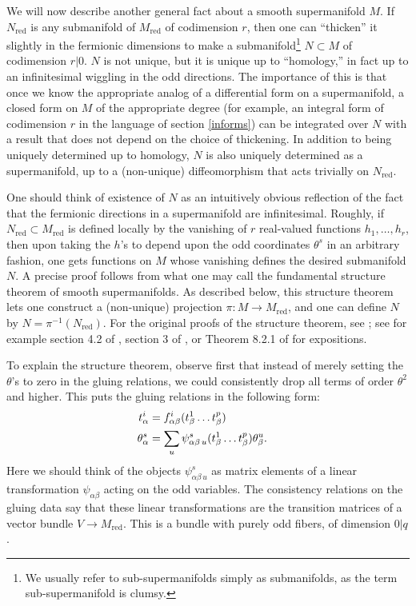 \documentclass[11pt,a4paper]{article}
\def\red{{\mathrm{red}}}
\begin{document}
We will now describe another general fact about a smooth supermanifold $M$.  If $N_\red$ is any submanifold of $M_\red$ of codimension $r$, then one can ``thicken'' it slightly in the fermionic
dimensions to make a submanifold\footnote{We usually refer to sub-supermanifolds simply as submanifolds, as the term sub-supermanifold is clumsy.}
$N\subset M$  of codimension $r|0$.  $N$ is not unique, but it is unique up to ``homology,'' in fact 
up to an 
infinitesimal wiggling in the odd directions.  The importance of this is that once we know the 
appropriate analog of a differential form on a supermanifold, a closed form on $M$ of the appropriate degree
(for example, an integral form of codimension $r$ in the language of section \ref{informs}) can be integrated over $N$ with a result that does not depend on the choice of thickening.  In addition to being uniquely determined up to homology, 
$N$ is also uniquely determined as a supermanifold, up to a (non-unique) diffeomorphism that acts trivially on $N_\red$.

One should think of existence of $N$ 
as an intuitively obvious reflection of the fact that the fermionic directions in a supermanifold
are infinitesimal.  Roughly, if $N_\red\subset M_\red$ is defined
locally by the vanishing of $r$ real-valued functions $h_1,\dots,h_r$, then upon taking the $h$'s to depend upon the odd coordinates $\theta^s$  in an arbitrary fashion, one
gets functions on $M$ whose vanishing defines the desired submanifold $N$.  A precise proof follows from what one may call the fundamental structure theorem of smooth supermanifolds.   As described 
below, this structure theorem lets one construct a (non-unique) projection $\pi:M\to M_\red$, and one can define  $N$ by $N=\pi^{-1}(N_\red)$. 
For  the original proofs of the structure theorem, see \cite{Ber, Bach, Gaw}; see for example section 4.2 of  \cite{Manin},  section 3 of   \cite{Voronov}, or Theorem 8.2.1 of \cite{Rogers} for expositions.

To explain the structure theorem, observe first that instead of merely setting the $\theta$'s to zero in the gluing relations, we could consistently drop
all terms of order $\theta^2$ and higher.  This puts the gluing relations in the following form:
\begin{align}\label{zoro}    t^i_\alpha & = f_{\alpha\beta}^i(t^1_\beta\dots t^p_\beta) \cr
                                                      \theta^s_\alpha& = \sum_u\psi_{\alpha\beta\,u}^s(t^1_\beta\dots t^p_\beta)\theta^u_\beta.\end{align}     
Here we should think of the objects $\psi_{\alpha\beta\,u}^s$ as matrix elements of a linear transformation $\psi_{\alpha\beta}$ acting on 
the odd variables.  The consistency relations on the gluing data say that these linear transformations are the transition matrices of
a vector bundle $V\to M_\red$.  This is a bundle with purely odd fibers, of dimension $0|q$.
\end{document}
